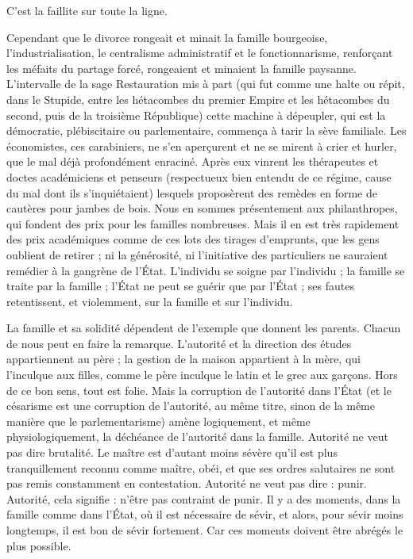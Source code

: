 \documentclass[french,twoside]{book} %
\begin{document}
C’est la faillite sur toute la ligne.\par
Cependant que le divorce rongeait et minait la famille bourgeoise, l’industrialisation, le centralisme administratif et le fonctionnarisme, renforçant les méfaits du partage forcé, rongeaient et minaient la famille paysanne. L’intervalle de la sage Restauration mis à part (qui fut comme une halte ou répit, dans le Stupide, entre les hétacombes du premier Empire et les hétacombes du second, puis de la troisième République) cette machine à dépeupler, qui est la démocratie, plébiscitaire ou parlementaire, commença à tarir la sève familiale. Les économistes, ces carabiniers, ne s’en aperçurent et ne se mirent à crier et hurler, que le mal déjà profondément enraciné. Après eux vinrent les thérapeutes et doctes académiciens et penseurs (respectueux bien entendu de ce régime, cause du mal dont ils s’inquiétaient) lesquels proposèrent des remèdes en forme de cautères pour jambes de bois. Nous en sommes présentement aux philanthropes, qui fondent des prix pour les familles nombreuses. Mais il en est très rapidement des prix académiques comme de ces lots des tirages d’emprunts, que les gens oublient de retirer ; ni la générosité, ni l’initiative des particuliers ne sauraient remédier à la gangrène de l’État. L’individu se soigne par l’individu ; la famille se traite par la famille ; l’État ne peut se guérir que par l’État ; ses fautes retentissent, et violemment, sur la famille et sur l’individu.\par
La famille et sa solidité dépendent de l’exemple que donnent les parents. Chacun de nous peut en faire la remarque. L’autorité et la direction des études appartiennent au père ; la gestion de la maison appartient à la mère, qui l’inculque aux filles, comme le père inculque le latin et le grec aux garçons. Hors de ce bon sens, tout est folie. Mais la corruption de l’autorité dans l’État (et le césarisme est une corruption de l’autorité, au même titre, sinon de la même manière que le parlementarisme) amène logiquement, et même physiologiquement, la déchéance de l’autorité dans la famille. Autorité ne veut pas dire brutalité. Le maître est d’autant moins sévère qu’il est plus tranquillement reconnu comme maître, obéi, et que ses ordres salutaires ne sont pas remis constamment en contestation. Autorité ne veut pas dire : punir. Autorité, cela signifie : n’être pas contraint de punir. Il y a des moments, dans la famille comme dans l’État, où il est nécessaire de sévir, et alors, pour sévir moins longtemps, il est bon de sévir fortement. Car ces moments doivent être abrégés le plus possible.\par
\end{document}
